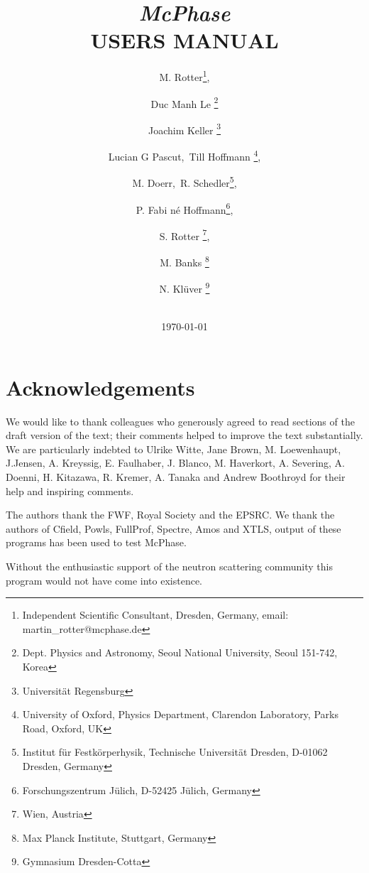 \documentclass[twoside]{article}
\begin{document}
 \title{ {\Huge \bf \em McPhase} \\
 \vspace{1cm} 
{\bf   USERS MANUAL}\\
  \vspace{2cm} 
\vspace{3cm}}

\date {\vspace{2cm} 
 \vspace{2cm}
 \\ \today}

\author{M. Rotter\thanks{Independent Scientific Consultant, Dresden, 
Germany, email: martin\_rotter@mcphase.de}, \and
Duc Manh Le \thanks{Dept. Physics and Astronomy, Seoul National University, Seoul 151-742, Korea}
\and Joachim Keller \thanks{Universit\"at Regensburg}
\and Lucian G Pascut,~Till Hoffmann 
\thanks{University of Oxford, Physics Department, Clarendon Laboratory, Parks Road, Oxford, UK},
\and
 M. Doerr,~R. Schedler\thanks{Institut f\"ur Festk\"orperhysik, Technische Universit\"at Dresden, D-01062 Dresden, Germany},
\and
P. Fabi n\'e Hoffmann\thanks{Forschungszentrum J\"ulich, D-52425 J\"ulich, Germany},
\and S. Rotter \thanks{Wien, Austria},
\and M. Banks \thanks{Max Planck Institute, Stuttgart, Germany}
\and N. Kl\"uver \thanks{Gymnasium Dresden-Cotta}
}


\maketitle
\clearpage

\section*{Acknowledgements}

We would like to thank colleagues who generously agreed to read sections of the draft version
of the text; their comments helped to improve the text substantially. We are particularly indebted to
Ulrike Witte, Jane Brown, M. Loewenhaupt, J.Jensen, A. Kreyssig, E. Faulhaber,
J. Blanco, M. Haverkort, A. Severing,
A. Doenni, H. Kitazawa, R. Kremer, A. Tanaka 
 and Andrew Boothroyd for their help and inspiring comments.

The authors thank the FWF, Royal Society and the EPSRC.
We thank the authors of Cfield, Powls, FullProf, Spectre, Amos and XTLS, output 
of these programs has been used to test McPhase. 

Without the enthusiastic support of the neutron scattering 
community this program would not have come into existence. 
\end{document}
